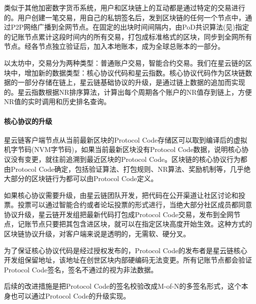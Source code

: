 类似于其他加密数字货币系统，用户和区块链上的互动都是通过特定的交易进行的。用户创建一笔交易，用自己的私钥签名后，发到区块链的任何一个节点中，通过P2P网络广播到全网节点。在固定的出块时间间隔内，由PoD共识算法(见)指定的记账节点累计这段时间内的所有交易，打包成标准格式的区块，同步到全网所有节点。经各节点独立验证后，加入本地账本，成为全球总账本的一部分。

以太坊中，交易分为两种类型：普通账户交易，智能合约交易。我们在星云链的区块中，增加新的数据类型：核心协议代码和星云指数。核心协议代码作为区块链数据的一部分存储在链上，星云链基础协议的升级，是通过链上数据的追加而实现的。星云指数根据NR排序算法，计算出每个周期各个账户的NR值存到链上，方便NR值的实时调用和历史排名查询。

\paragraph{核心协议的升级}

星云链客户端节点从当前最新区块的Protocol Code存储区可以取到编译后的虚拟机字节码(NVM字节码)，如果当前最新区块没有Protocol Code数据，说明核心协议没有变更，就往前追溯到最近区块的Protocol Code。区块链的核心协议行为都由Protocol Code确定，包括验证算法、打包规则、NR算法、奖励机制等，几乎绝大部分的区块链行为都可以由Protocol Code定义。

如果核心协议需要升级，由星云链团队开发，把代码在公开渠道让社区讨论和投票。投票可以通过智能合约或者论坛投票的形式进行，当绝大部分社区成员都同意协议升级，星云链开发组把最新代码打包成Protocol Code交易，发布到全网节点，记账节点只要把其包含进区块，就可以在指定区块高度开始生效。这种方式的区块链协议升级，对客户端来说是透明的，无需软、硬分叉。

为了保证核心协议代码是经过授权发布的，Protocol Code的发布者是星云链核心开发组保留地址，该地址在创世区块内部硬编码无法变更。所有记账节点都会验证Protocol Code签名，签名不通过的视为非法数据。

后续的改进措施是把Protocol Code的签名校验改成M-of-N的多签名形式，这个本身也可以通过Protocol Code的升级实现。
